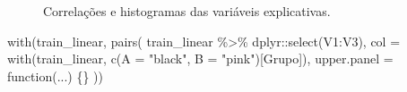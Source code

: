 \documentclass[
  a4paperpaper,
]{article}
\newenvironment{Shaded}{\begin{snugshade}}{\end{snugshade}}
\newcommand{\AttributeTok}[1]{\textcolor[rgb]{0.40,0.45,0.13}{#1}}
\newcommand{\ControlFlowTok}[1]{\textcolor[rgb]{0.00,0.23,0.31}{#1}}
\newcommand{\FunctionTok}[1]{\textcolor[rgb]{0.28,0.35,0.67}{#1}}
\newcommand{\NormalTok}[1]{\textcolor[rgb]{0.00,0.23,0.31}{#1}}
\newcommand{\SpecialCharTok}[1]{\textcolor[rgb]{0.37,0.37,0.37}{#1}}
\newcommand{\StringTok}[1]{\textcolor[rgb]{0.13,0.47,0.30}{#1}}
\begin{document}
\begin{figure}[H]


\caption{\label{fig-linear1}Correlações e histogramas das variáveis
explicativas.}

\end{figure}%

\begin{Shaded}
\begin{Highlighting}[]
\FunctionTok{with}\NormalTok{(train\_linear, }\FunctionTok{pairs}\NormalTok{(}
\NormalTok{  train\_linear }\SpecialCharTok{\%\textgreater{}\%}\NormalTok{ dplyr}\SpecialCharTok{::}\FunctionTok{select}\NormalTok{(V1}\SpecialCharTok{:}\NormalTok{V3),}
  \AttributeTok{col =} \FunctionTok{with}\NormalTok{(train\_linear, }\FunctionTok{c}\NormalTok{(}\AttributeTok{A =} \StringTok{"black"}\NormalTok{, }\AttributeTok{B =} \StringTok{"pink"}\NormalTok{)[Grupo]),}
  \AttributeTok{upper.panel =} \ControlFlowTok{function}\NormalTok{(...) \{\}}
\NormalTok{))}
\end{Highlighting}
\end{Shaded}
\end{document}
